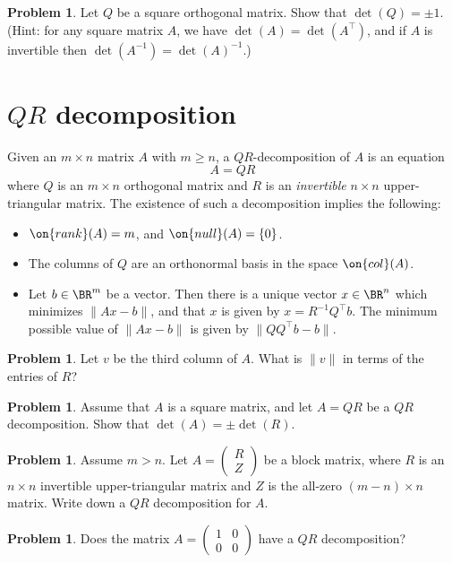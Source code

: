 \documentclass[10pt]{amsart}
\theoremstyle{mythm}
\theoremstyle{definition}
\newtheorem{prob}[thm]{Problem}
\theoremstyle{myrmk}
\begin{document}
	\begin{prob}
		Let $Q$ be a square orthogonal matrix. Show that $\det(Q) = \pm 1$. (Hint: for any square matrix $A$, we have $\det(A) = \det(A^\top)$, and if $A$ is invertible then $\det(A^{-1}) = \det(A)^{-1}$.) 
	\end{prob}
	
	\section{$QR$ decomposition}
	
	Given an $m \times n$ matrix $A$ with $m \ge n$, a $QR$-decomposition of $A$ is an equation  
	\[
		A = QR
	\]
	where $Q$ is an $m \times n$ orthogonal matrix and $R$ is an \emph{invertible} $n \times n$ upper-triangular matrix. The existence of such a decomposition implies the following:  
	\begin{itemize}
		\item $\on{rank}(A) = m$, and $\on{null}(A) = \{0\}$. 
		\item The columns of $Q$ are an orthonormal basis in the space $\on{col}(A)$. 
		\item Let $b \in \BR^m$ be a vector. Then there is a unique vector $x \in \BR^n$ which minimizes $\lVert Ax-b \rVert$, and that $x$ is given by $x = R^{-1}Q^\top b$. The minimum possible value of $\lVert Ax-b \rVert$ is given by $\lVert QQ^\top b - b \rVert$. 
	\end{itemize}
	\begin{prob}
		Let $v$ be the third column of $A$. What is $\lVert v \rVert$ in terms of the entries of $R$? 
	\end{prob}
	\begin{prob}
		Assume that $A$ is a square matrix, and let $A = QR$ be a $QR$ decomposition. Show that $\det(A) = \pm \det(R)$. 
	\end{prob}
	\begin{prob}
		Assume $m > n$. Let $A = \left(\begin{array}{cc}
		R \\ \hline Z
		\end{array}\right)$ be a block matrix, where $R$ is an $n \times n$ invertible upper-triangular matrix and $Z$ is the all-zero $(m-n) \times n$ matrix. Write down a $QR$ decomposition for $A$. 
	\end{prob}
	\begin{prob}
		Does the matrix $A = \begin{pmatrix}
		1 & 0 \\ 0 & 0
		\end{pmatrix}$ have a $QR$ decomposition? 
	\end{prob}
	
\end{document}
